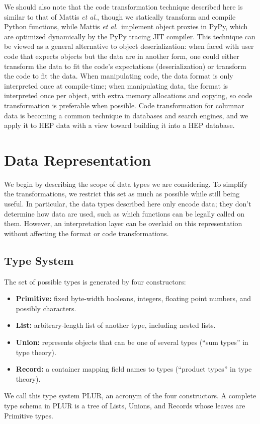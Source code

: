 \documentclass[10pt, conference, compsocconf]{IEEEtran}
\begin{document}
We should also note that the code transformation technique described here is similar to that of Mattis {\it et al}.\cite{columnarobjects}, though we statically transform and compile Python functions, while Mattis {\it et al}.\ implement object proxies in PyPy, which are optimized dynamically by the PyPy tracing JIT compiler. This technique can be viewed as a general alternative to object deserialization: when faced with user code that expects objects but the data are in another form, one could either transform the data to fit the code's expectations (deserialization) or transform the code to fit the data. When manipulating code, the data format is only interpreted once at compile-time; when manipulating data, the format is interpreted once per object, with extra memory allocations and copying, so code transformation is preferable when possible. Code transformation for columnar data is becoming a common technique in databases and search engines\cite{searchengine}, and we apply it to HEP data with a view toward building it into a HEP database.

\section{Data Representation}

We begin by describing the scope of data types we are considering. To simplify the transformations, we restrict this set as much as possible while still being useful. In particular, the data types described here only encode data; they don't determine how data are used, such as which functions can be legally called on them. However, an interpretation layer can be overlaid on this representation without affecting the format or code transformations.

\subsection{Type System}
\label{type-system}

The set of possible types is generated by four constructors:
\begin{itemize}
\item {\bf Primitive:} fixed byte-width booleans, integers, floating point numbers, and possibly characters.
\item {\bf List:} arbitrary-length list of another type, including nested lists.
\item {\bf Union:} represents objects that can be one of several types (``sum types'' in type theory).
\item {\bf Record:} a container mapping field names to types (``product types'' in type theory).
\end{itemize}
We call this type system PLUR, an acronym of the four constructors. A complete type schema in PLUR is a tree of Lists, Unions, and Records whose leaves are Primitive types.
\end{document}
